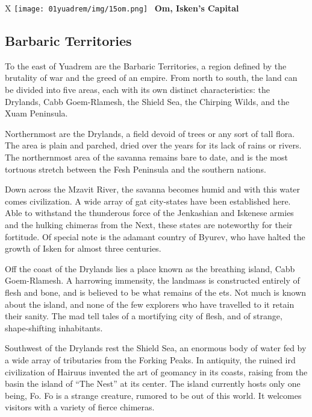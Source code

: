 
\begin{table*}[b]%
    \begin{DndTable}[width=\linewidth]{X}
        \centering
        \texttt{[image: 01yuadrem/img/15om.png]} \
        \centering \large{\textbf{Om, Isken's Capital}}
    \end{DndTable}
\end{table*}

\subsection*{Barbaric Territories} \label{ssec::barbaricterritories}

To the east of Yuadrem are the Barbaric Territories, a region defined by the brutality of war and the greed of an empire.
From north to south, the land can be divided into five areas, each with its own distinct characteristics: the Drylands, Cabb Goem-Rlamesh, the Shield Sea, the Chirping Wilds, and the Xuam Peninsula.

Northernmost are the Drylands, a field devoid of trees or any sort of tall flora.
The area is plain and parched, dried over the years for its lack of rains or rivers.
The northernmost area of the savanna remains bare to date, and is the most tortuous stretch between the Fesh Peninsula and the southern nations.

Down across the Mzavit River, the savanna becomes humid and with this water comes civilization.
A wide array of gat city-states have been established here.
Able to withstand the thunderous force of the Jenkashian and Iskenese armies and the hulking chimeras from the Next, these states are noteworthy for their fortitude.
Of special note is the adamant country of Byurev, who have halted the growth of Isken for almost three centuries.

Off the coast of the Drylands lies a place known as the breathing island, Cabb Goem-Rlamesh.
A harrowing immensity, the landmass is constructed entirely of flesh and bone, and is believed to be what remains of the ets.
Not much is known about the island, and none of the few explorers who have travelled to it retain their sanity.
The mad tell tales of a mortifying city of flesh, and of strange, shape-shifting inhabitants.

Southwest of the Drylands rest the Shield Sea, an enormous body of water fed by a wide array of tributaries from the Forking Peaks.
In antiquity, the ruined ird civilization of Hairuus invented the art of geomancy in its coasts, raising from the basin the island of ``The Nest'' at its center.
The island currently hosts only one being, Fo.
Fo is a strange creature, rumored to be out of this world.
It welcomes visitors with a variety of fierce chimeras.

